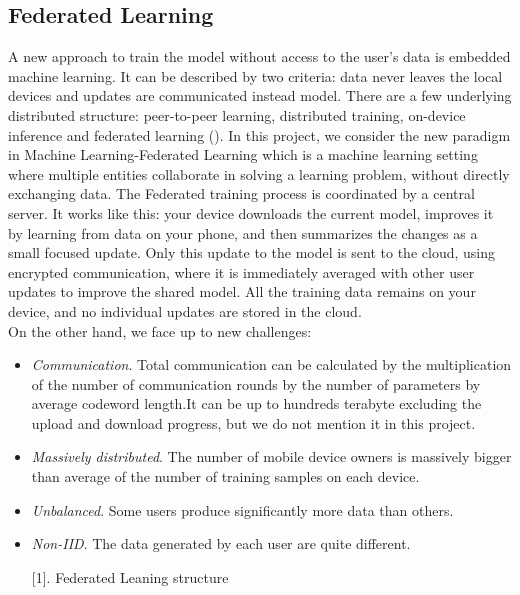 \documentclass{article}
\theoremstyle{theorem}
\theoremstyle{definition}
\begin{document}
	\subsection{Federated Learning}
	A new approach to train the model without access to the user's data is embedded machine learning. It can be described by two criteria: data never leaves the local devices and updates are communicated instead model. There are a few underlying distributed structure: peer-to-peer learning, distributed training, on-device inference and federated learning (\cite{cite1}). In this project, we consider the new paradigm in Machine Learning-Federated Learning which is a machine learning setting where multiple entities collaborate in solving a learning problem, without directly exchanging data. The Federated training process is coordinated by a central server. It works like this: your device downloads the current model, improves it by learning from data on your phone, and then summarizes the changes as a small focused update. Only this update to the model is sent to the cloud, using encrypted communication, where it is immediately averaged with other user updates to improve the shared model. All the training data remains on your device, and no individual updates are stored in the cloud.\\
	On the other hand, we face up to new challenges: \begin{itemize}
		\item \textit{Communication}.  Total communication can be calculated by the multiplication of the number of communication rounds by the number of parameters by average codeword length.It can be up to hundreds terabyte excluding the upload and download progress, but we do not mention it in this project. 
		\item \textit{Massively distributed}. The number of mobile device owners is massively bigger than average of the number of training samples on each device.
		\item \textit{Unbalanced}. Some users produce significantly more data than others.
		\item \textit{Non-IID}.	The data generated by each user are quite different.
	
\begin{center}
\begin{center}
	\figurename[1]{. Federated Leaning structure}
\end{center}
\end{center}		
	\end{itemize}
\end{document}
